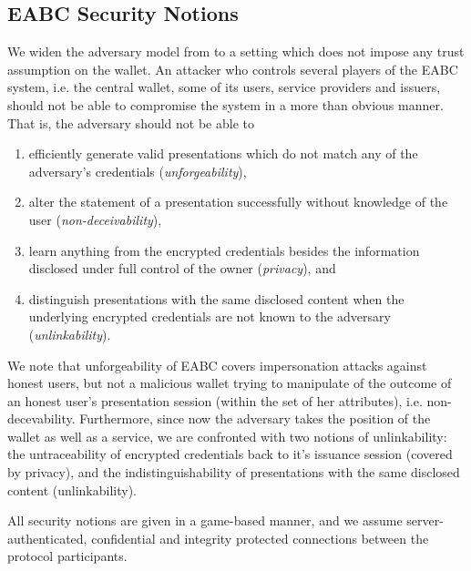 \documentclass[runningheads]{llncs}
\begin{document}





\subsection{EABC Security Notions}
\label{s:EABCsecurity}

We widen the adversary model from \cite{towardsEABC} to a setting which does not impose any trust assumption on the wallet.
An attacker who controls several players of the EABC system, i.e. the central wallet, some of its users, service providers and issuers, should not be able to compromise the system in a more than obvious manner.
That is, the adversary should not be able to 
\begin{enumerate}
\item
efficiently generate valid presentations which do not match any of the adversary's credentials (\emph{unforgeability}), 
\item
alter the statement of a presentation successfully without knowledge of the user (\emph{non-deceivability}),  
\item
learn anything from the encrypted credentials besides the information disclosed under full control of the owner (\emph{privacy}), and 
\item
distinguish presentations with the same disclosed content when the underlying encrypted credentials are not known to the adversary (\emph{unlinkability}).
\end{enumerate} 
\ifCANS
\else
We note that unforgeability of EABC covers impersonation attacks against honest users, but not a malicious wallet trying to manipulate of the outcome of an honest user's presentation session (within the set of her attributes),  i.e. non-decevability.
Furthermore, since now the adversary takes the position of the wallet as well as a service, we are confronted with two notions of unlinkability:
the untraceability of encrypted credentials back to it's issuance session (covered by privacy), and the indistinguishability of presentations with the same disclosed content (unlinkability).
\fi

All security notions are given in a game-based manner, and we assume server-authenticated, confidential and integrity protected connections between the protocol participants.%
\end{document}

